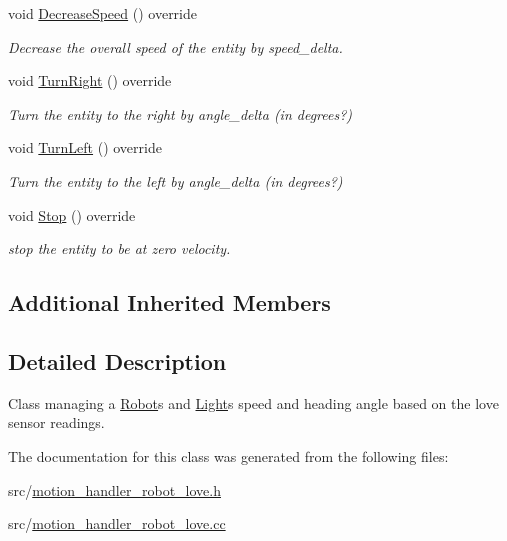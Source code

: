\begin{DoxyCompactItemize}
void \mbox{\hyperlink{class_motion_handler_robot_love_af64d850f198beaccdc9dad1a519c387c}{Decrease\+Speed}} () override
\begin{DoxyCompactList}\small\item\em Decrease the overall speed of the entity by speed\+\_\+delta. \end{DoxyCompactList}\item 
\mbox{\label{class_motion_handler_robot_love_aeff4a675940af2d42c6a8fd2a4519d66}} 
void \mbox{\hyperlink{class_motion_handler_robot_love_aeff4a675940af2d42c6a8fd2a4519d66}{Turn\+Right}} () override
\begin{DoxyCompactList}\small\item\em Turn the entity to the right by angle\+\_\+delta (in degrees?) \end{DoxyCompactList}\item 
\mbox{\label{class_motion_handler_robot_love_a26b07483889261be22d5df90d2bdf81c}} 
void \mbox{\hyperlink{class_motion_handler_robot_love_a26b07483889261be22d5df90d2bdf81c}{Turn\+Left}} () override
\begin{DoxyCompactList}\small\item\em Turn the entity to the left by angle\+\_\+delta (in degrees?) \end{DoxyCompactList}\item 
\mbox{\label{class_motion_handler_robot_love_aaff39b4c62e5c46743bc65af94e9a09a}} 
void \mbox{\hyperlink{class_motion_handler_robot_love_aaff39b4c62e5c46743bc65af94e9a09a}{Stop}} () override
\begin{DoxyCompactList}\small\item\em stop the entity to be at zero velocity. \end{DoxyCompactList}\end{DoxyCompactItemize}
\subsection*{Additional Inherited Members}


\subsection{Detailed Description}
Class managing a \mbox{\hyperlink{class_robot}{Robot}}\textquotesingle{}s and \mbox{\hyperlink{class_light}{Light}}\textquotesingle{}s speed and heading angle based on the love sensor readings. 

The documentation for this class was generated from the following files\+:\begin{DoxyCompactItemize}
\item 
src/\mbox{\hyperlink{motion__handler__robot__love_8h}{motion\+\_\+handler\+\_\+robot\+\_\+love.\+h}}\item 
src/\mbox{\hyperlink{motion__handler__robot__love_8cc}{motion\+\_\+handler\+\_\+robot\+\_\+love.\+cc}}\end{DoxyCompactItemize}
